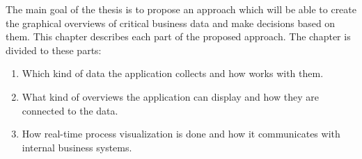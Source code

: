 
The main goal of the thesis is to propose an approach which will be able to create the graphical overviews of critical business data and make decisions based on them. This chapter describes each part of the proposed approach. The chapter is divided to these parts:	
    \begin{enumerate}
      \item Which kind of data the application collects and how works with them.
      \item What kind of overviews the application can display and how they are connected to the data.
      \item How real-time process visualization is done and how it communicates with internal business systems.
    \end{enumerate}
    
